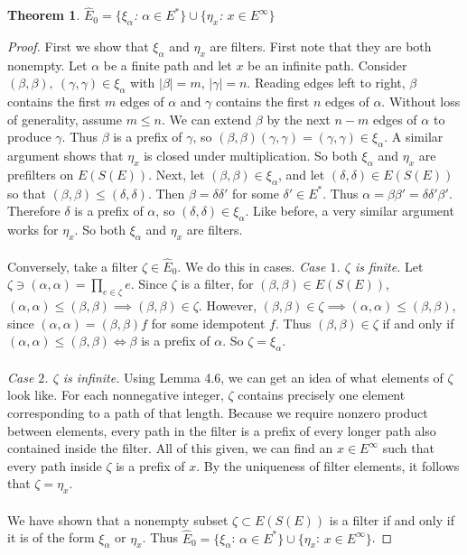\documentclass[12pt]{article}
\newtheorem{theorem}{Theorem}[section]
\theoremstyle{definition}
\begin{document}
\begin{theorem} $\hat{E}_0 = \{\xi_\alpha$: $\alpha \in E^*\} \cup \{\eta_x$: $x \in E^\infty\}$ \end{theorem}
\begin{proof}
    First we show that $\xi_\alpha$ and $\eta_x$ are filters. First note that they are both nonempty. Let $\alpha$ be a finite path and let $x$ be an infinite path.
    Consider $(\beta, \beta), \ (\gamma, \gamma) \in \xi_\alpha$ with $|\beta| = m$, $|\gamma| = n$. 
    Reading edges left to right, $\beta$ contains the first $m$ edges of $\alpha$ and $\gamma$ 
    contains the first $n$ edges of $\alpha$. Without loss of generality, assume $m \leq n$. 
    We can extend $\beta$ by the next $n - m$ edges of $\alpha$ to produce $\gamma$. Thus
    $\beta$ is a prefix of $\gamma$, so $(\beta, \beta)(\gamma, \gamma) = (\gamma, \gamma) \in \xi_\alpha$.
    A similar argument shows that $\eta_x$ is closed under multiplication. So both $\xi_\alpha$ and $\eta_x$ are prefilters
    on $E(S(E))$. Next, let $(\beta, \beta) \in \xi_\alpha$, and let $(\delta, \delta) \in E(S(E))$ so that 
    $(\beta, \beta) \leq (\delta, \delta)$. Then $\beta = \delta \delta'$ for some $\delta' \in E^*$. 
    Thus $\alpha = \beta \beta' = \delta \delta' \beta'$. Therefore $\delta$ is a prefix of $\alpha$, so 
    $(\delta, \delta) \in \xi_\alpha$. Like before, a very similar argument works for $\eta_x$. So both 
    $\xi_\alpha$ and $\eta_x$ are filters.
    \\ \\
    Conversely, take a filter $\zeta \in \hat{E}_0$. We do this in cases. \emph{Case $1$. $\zeta$ is finite.}
    Let $\zeta \ni (\alpha, \alpha) = \prod_{e \in \zeta} e$. Since $\zeta$ is a filter,
    for $(\beta, \beta) \in E(S(E))$, $(\alpha, \alpha) \leq (\beta, \beta) \implies (\beta, \beta) \in \zeta$.
    However, $(\beta, \beta) \in \zeta \implies (\alpha, \alpha) \leq (\beta, \beta)$, since $(\alpha, \alpha) = (\beta, \beta)f$ for some idempotent $f$.
    Thus $(\beta, \beta) \in \zeta$ if and only if $(\alpha, \alpha) \leq (\beta, \beta) \iff \beta$ is a prefix of $\alpha$. So $\zeta = \xi_\alpha$.
    \\ \\
    \emph{Case $2$. $\zeta$ is infinite.}
    Using Lemma 4.6, we can get an idea of what elements of $\zeta$ look like.
    For each nonnegative integer, $\zeta$ contains precisely one element corresponding
    to a path of that length. Because we require nonzero product between elements, every
    path in the filter is a prefix of every longer path also contained inside the filter.
    All of this given, we can find an $x \in E^\infty$ such that every path inside $\zeta$
    is a prefix of $x$. By the uniqueness of filter elements, it follows that $\zeta = \eta_x$.
    \\ \\
    We have shown that a nonempty subset $\zeta \subset E(S(E))$ is a filter if and only if
    it is of the form $\xi_\alpha$ or $\eta_x$. Thus $\hat{E}_0 = \{\xi_\alpha$: $\alpha \in E^*\} \cup \{\eta_x$: $x \in E^\infty\}$.
\end{proof}
\end{document}
